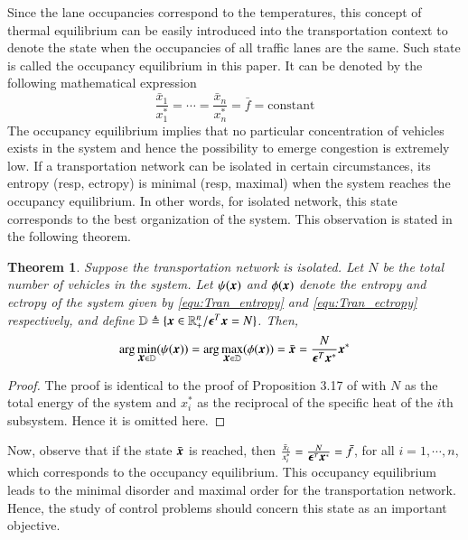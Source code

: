 \documentclass[preprint,authoryear,12pt]{elsarticle}
\renewcommand{\vec}[1]{\mbox{\boldmath$#1$}}
\newtheorem{thm}{Theorem}
\begin{document}
Since the lane occupancies correspond to the temperatures, this
concept of thermal equilibrium can be easily introduced into the
transportation context to denote the state when the occupancies of
all traffic lanes are the same. Such state is called the occupancy
equilibrium in this paper. It can be denoted by the following
mathematical expression
\begin{equation}\label{equ:equilibrium}
\frac{\bar{x}_1}{x_1^*}=\cdots=\frac{\bar{x}_n}{x_n^*}=\bar{f}=\text{
constant}
\end{equation}
The occupancy equilibrium implies that no particular concentration of
vehicles exists in the system and hence the possibility to emerge
congestion is extremely low.
If a transportation network can be isolated in certain circumstances,
its entropy (resp, ectropy) is minimal (resp, maximal) when
the system reaches the occupancy equilibrium. In other words, for
isolated network, this state corresponds to the best organization of
the system. This observation is stated in the following theorem.

\begin{thm}\label{thm:entropy_equilibrium}
Suppose the transportation network is isolated. Let $N$ be the total
number of vehicles in the system. Let $\psi(\vec{x})$ and
$\phi(\vec{x})$ denote the entropy and ectropy of the system  given
by \eqref{equ:Tran_entropy} and \eqref{equ:Tran_ectropy}
respectively, and define $\mathbb{D}\triangleq
\{\vec{x}\in\mathbb{R}^n_+/\vec{\epsilon}^T\vec{x}=N\}$. Then,
\begin{equation}\label{equ:entropy_equilibrium}
\arg\min_{\vec{x}\in\mathbb{D}}(\psi(\vec{x})) =
\arg\max_{\vec{x}\in\mathbb{D}}(\phi(\vec{x})) = \bar{\vec{x}} =
\frac{N}{\vec{\epsilon}^T\vec{x}^*}\vec{x}^*
\end{equation}
\end{thm}
\begin{proof}  The proof is identical to the proof of Proposition 3.17
of \citet{haddad_thermodynamic_2005} with $N$ as the total energy of
the system 
and $x^*_i$ as the reciprocal of the specific heat of the $i$th
subsystem. Hence it is omitted here.
\end{proof}%

Now, observe that if the state $ \bar{\vec{x}}$ is reached, then
$\frac{\bar{x}_i}{x_i^*}=\frac{N}{\vec{\epsilon}^T\vec{x}^*}=\bar{f}$,
for all $i=1,\cdots, n$, which corresponds to the occupancy
equilibrium. This occupancy equilibrium leads to the minimal disorder
and maximal order for the transportation network. Hence, the study of
control problems should concern this state as an important objective.
\end{document}
